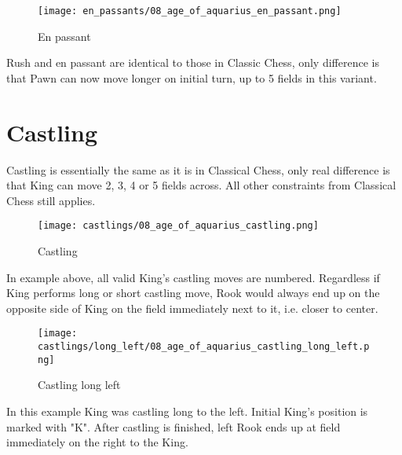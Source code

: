 \noindent
\begin{wrapfigure}{l}{0.4\textwidth}
\centering
\texttt{[image: en\_passants/08\_age\_of\_aquarius\_en\_passant.png]}
\caption{En passant}
\label{fig:08_age_of_aquarius_en_passant}
\end{wrapfigure}
Rush and en passant are identical to those in Classic Chess, only difference
is that Pawn can now move longer on initial turn, up to 5 fields in this
variant.

\clearpage %

\section*{Castling}

Castling is essentially the same as it is in Classical Chess, only real difference is that
King can move 2, 3, 4 or 5 fields across. All other constraints from Classical Chess still
applies.

\noindent
\begin{figure}[!h]
\texttt{[image: castlings/08\_age\_of\_aquarius\_castling.png]}
\caption{Castling}
\label{fig:08_age_of_aquarius_castling}
\end{figure}

In example above, all valid King's castling moves are numbered. Regardless if King performs
long or short castling move, Rook would always end up on the opposite side of King on the
field immediately next to it, i.e. closer to center.

\noindent
\begin{figure}[!h]
\texttt{[image: castlings/long\_left/08\_age\_of\_aquarius\_castling\_long\_left.png]}
\caption{Castling long left}
\label{fig:08_age_of_aquarius_castling_long_left}
\end{figure}

In this example King was castling long to the left. Initial King's position is marked with "K".
After castling is finished, left Rook ends up at field immediately on the right to the King.

\clearpage %


